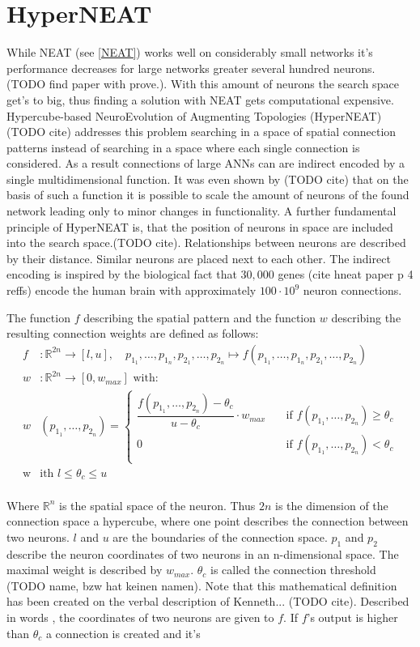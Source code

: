 \section{HyperNEAT}\label{HYPERNEAT}
 While NEAT (see \ref{NEAT}) works well on considerably small networks it's performance decreases for large networks greater several hundred neurons. (TODO find paper with prove.). With this amount of neurons the search space get's to big, thus finding a solution with NEAT gets computational expensive. 
 Hypercube-based NeuroEvolution of Augmenting Topologies (HyperNEAT) (TODO cite) addresses this problem searching in a space of spatial connection patterns instead of searching in a space where each single connection is considered. As a result connections of large ANNs can are indirect encoded by a single multidimensional function. It was even shown by (TODO cite) that on the basis of such a function it is possible to scale the amount of neurons of the found network leading only to minor changes in functionality. A further fundamental principle of HyperNEAT is, that the position of neurons in space are included into the search space.(TODO cite). Relationships between neurons are described by their distance. Similar neurons are placed next to each other. The indirect encoding is inspired by the biological fact that $30,000$ genes  (cite hneat paper p 4 reffs) encode the human brain with approximately $100 \cdot10^9$ neuron connections.
 
 The function $f$ describing the spatial pattern and the function  $w$ describing the resulting connection weights are defined as follows: 
\begin{align*} \label{HyperNEatFunction}
 f&\colon \mathbb{R}^{2n} \to [l,u], \quad  p_{1_1},\ldots,p_{1_n},p_{2_1},\ldots,p_{2_n} \mapsto f(p_{1_1},\ldots,p_{1_n},p_{2_1},\ldots,p_{2_n})\\
 w&\colon \mathbb{R}^{2n} \to [0,w_{max}] \text{ with: }\\
 w&(p_{1_1},\ldots,p_{2_n})=\begin{cases}
 \dfrac{f(p_{1_1},\ldots,p_{2_n})-\theta_c}{u-\theta_c} \cdot w_{max} & \quad \text{if } f(p_{1_1},\ldots,p_{2_n}) \geq \theta_c \\
 0 & \quad \text{if } f(p_{1_1},\ldots,p_{2_n}) < \theta_c \\
 \end{cases}\\
 \text{w}&\text{ith } l\leq \theta_c \leq u  
 \end{align*}\\
 Where $\mathbb{R}^n$ is the spatial space of the neuron. Thus $2n$ is the dimension of the connection space a hypercube, where one point describes the connection between two neurons. $l$ and $u$ are the boundaries of the connection space. $p_1$ and $p_2$ describe the neuron coordinates of two neurons in an n-dimensional space. The maximal weight is described by $w_{max}$. $\theta_c$ is called the connection threshold (TODO name, bzw hat keinen namen).
 Note that this mathematical definition has been created on the verbal description of Kenneth... (TODO cite). Described in words , the coordinates of two neurons are given to $f$. If $f$'s output is higher than $\theta_c$ a connection is created and it's
